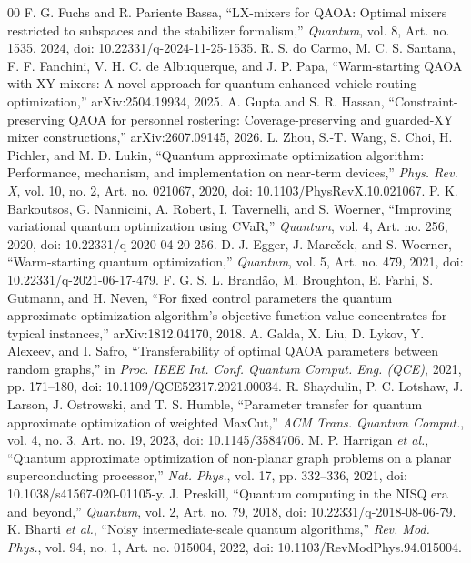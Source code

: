 \documentclass[conference]{IEEEtran}
\begin{document}
\begin{thebibliography}{00}
 F. G. Fuchs and R. Pariente Bassa, ``LX-mixers for QAOA: Optimal mixers restricted to subspaces and the stabilizer formalism,'' \textit{Quantum}, vol. 8, Art. no. 1535, 2024, doi: 10.22331/q-2024-11-25-1535.
 R. S. do Carmo, M. C. S. Santana, F. F. Fanchini, V. H. C. de Albuquerque, and J. P. Papa, ``Warm-starting QAOA with XY mixers: A novel approach for quantum-enhanced vehicle routing optimization,'' arXiv:2504.19934, 2025.
 A. Gupta and S. R. Hassan, ``Constraint-preserving QAOA for personnel rostering: Coverage-preserving and guarded-XY mixer constructions,'' arXiv:2607.09145, 2026.
 L. Zhou, S.-T. Wang, S. Choi, H. Pichler, and M. D. Lukin, ``Quantum approximate optimization algorithm: Performance, mechanism, and implementation on near-term devices,'' \textit{Phys. Rev. X}, vol. 10, no. 2, Art. no. 021067, 2020, doi: 10.1103/PhysRevX.10.021067.
 P. K. Barkoutsos, G. Nannicini, A. Robert, I. Tavernelli, and S. Woerner, ``Improving variational quantum optimization using CVaR,'' \textit{Quantum}, vol. 4, Art. no. 256, 2020, doi: 10.22331/q-2020-04-20-256.
 D. J. Egger, J. Mare\v{c}ek, and S. Woerner, ``Warm-starting quantum optimization,'' \textit{Quantum}, vol. 5, Art. no. 479, 2021, doi: 10.22331/q-2021-06-17-479.
 F. G. S. L. Brand\~{a}o, M. Broughton, E. Farhi, S. Gutmann, and H. Neven, ``For fixed control parameters the quantum approximate optimization algorithm's objective function value concentrates for typical instances,'' arXiv:1812.04170, 2018.
 A. Galda, X. Liu, D. Lykov, Y. Alexeev, and I. Safro, ``Transferability of optimal QAOA parameters between random graphs,'' in \textit{Proc. IEEE Int. Conf. Quantum Comput. Eng. (QCE)}, 2021, pp. 171--180, doi: 10.1109/QCE52317.2021.00034.
 R. Shaydulin, P. C. Lotshaw, J. Larson, J. Ostrowski, and T. S. Humble, ``Parameter transfer for quantum approximate optimization of weighted MaxCut,'' \textit{ACM Trans. Quantum Comput.}, vol. 4, no. 3, Art. no. 19, 2023, doi: 10.1145/3584706.
 M. P. Harrigan \textit{et al.}, ``Quantum approximate optimization of non-planar graph problems on a planar superconducting processor,'' \textit{Nat. Phys.}, vol. 17, pp. 332--336, 2021, doi: 10.1038/s41567-020-01105-y.
 J. Preskill, ``Quantum computing in the NISQ era and beyond,'' \textit{Quantum}, vol. 2, Art. no. 79, 2018, doi: 10.22331/q-2018-08-06-79.
 K. Bharti \textit{et al.}, ``Noisy intermediate-scale quantum algorithms,'' \textit{Rev. Mod. Phys.}, vol. 94, no. 1, Art. no. 015004, 2022, doi: 10.1103/RevModPhys.94.015004.

\end{thebibliography}
\end{document}
